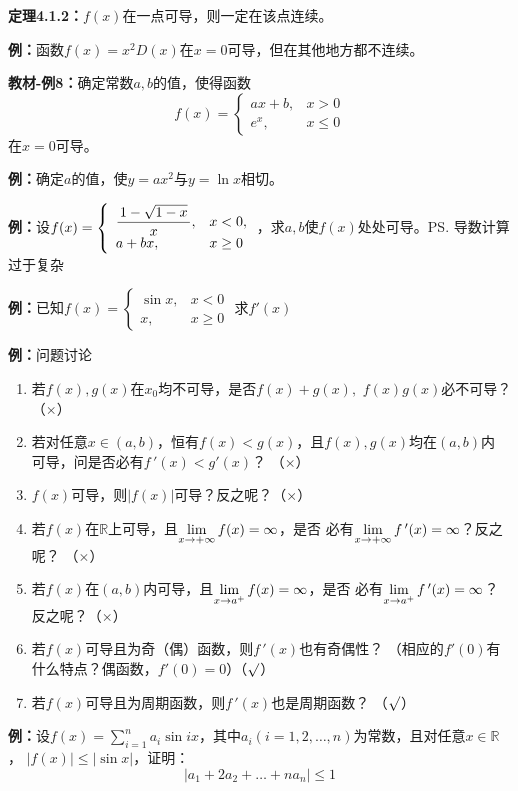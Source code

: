 {\bf 定理4.1.2：}$f(x)$在一点可导，则一定在该点连续。

{\bf 例：}函数$f(x)=x^2D(x)$在$x=0$可导，但在其他地方都不连续。

{\bf 教材-例8：}确定常数$a,b$的值，使得函数
$$f(x)=\left\{\begin{array}{ll}ax+b,& x>0\\
e^x,& x\leq 0\end{array}\right.$$
在$x=0$可导。

{\bf 例：}确定$a$的值，使$y=ax^2$与$y=\ln x$相切。

{\bf 例：}设$f(x)=\left\{\begin{array}{ll}
\displaystyle\frac{\,{1-\sqrt{1-x}}\,}{\,{x}\,}, & x<0,\\
a+bx, & x\geq 0
\end{array}\right.$，求$a,b$使$f(x)$处处可导。\ps{导数计算过于复杂}

{\bf 例：}已知$f(x)=\left\{\begin{array}{ll}
\sin x,& x<0\\ x,& x\geq 0
\end{array}\right.$
求$f'(x)$

{\bf 例：}问题讨论
\begin{enumerate} 
  \setlength{\itemindent}{1cm}
  \item 若$f(x),g(x)$在$x_0$均不可导，是否$f(x)+g(x),$ $f(x)g(x)$必不可导？
  （{$\times$}） 
  \item 若对任意$x\in (a,b)$，恒有$f(x)<g(x)$，且$f(x),g(x)$均在$(a,b)$内
  可导，问是否必有$f\,'(x)<g'(x)$？ （{$\times$}） 
  \item $f(x)$可导，则$|f(x)|$可导？反之呢？（{$\times$}）
  \item 若$f(x)$在$\mathbb{R}$上可导，且$\lim\limits_{x\to{+\infty}}f(x)=\infty$，是否
  必有$\lim\limits_{x\to{+\infty}}f\,'(x)=\infty$？反之呢？ （{$\times$}）
  \item 若$f(x)$在$(a,b)$内可导，且$\lim\limits_{x\to{a^+}}f(x)=\infty$，是否
  必有$\lim\limits_{x\to{a^+}}f\,'(x)=\infty$？ 反之呢？（{$\times$}） 
  \item 若$f(x)$可导且为奇（偶）函数，则$f\,'(x)$也有奇偶性？ 
  （相应的$f'(0)$有什么特点？偶函数，$f'(0)=0$）（{$\surd$}） 
  \item 若$f(x)$可导且为周期函数，则$f\,'(x)$也是周期函数？ （{$\surd$}）
\end{enumerate}

{\bf 例：}设$f(x)=\sum\limits_{i=1}^na_i\sin
ix$，其中$a_i(i=1,2,\ldots,n)$为常数，且对任意$x\in\mathbb{R}$， 
$|f(x)|\leq |\sin x|$，证明：
$$\left|a_1+2a_2+\ldots+na_n\right|\leq 1$$

